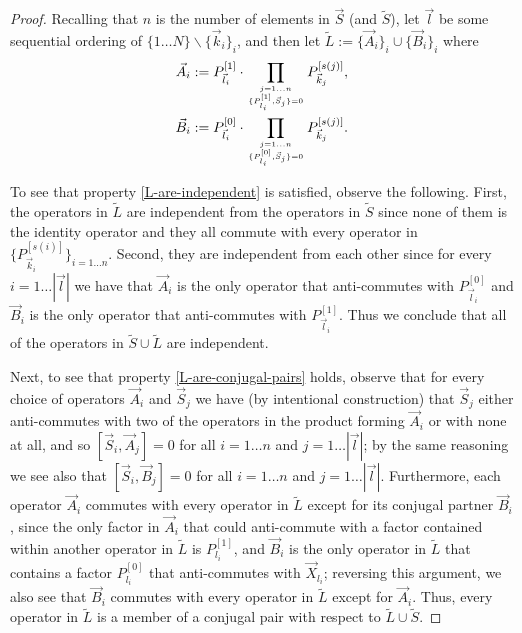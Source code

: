 \documentclass[twocolumn,showpacs,preprintnumbers,amsmath,amssymb,nofootinbib,pra,floatfix]{revtex4-1}
\newcommand{\lst}{\vec}
\newcommand{\set}{\tilde}
\begin{document}
\begin{proof}
Recalling that $n$ is the number of elements in $\lst S$ (and $\set S$), let $\lst l$ be some sequential ordering of $\{1 \dots N\}\backslash\{\vec k_i\}_i$, and then let $\set L:=\{\lst A_i\}_i\cup\{\lst B_i\}_i$ where
$$
\begin{aligned}
\lst A_i &:= P_{\lst l_i}^{[1]}\cdot \prod_{j=1\dots n\atop \{P_{l_i}^{[1]},\lst S_j\}=0} P_{\lst k_j}^{[s(j)]},\\
\lst B_i &:= P_{\lst l_i}^{[0]}\cdot \prod_{j=1\dots n\atop \{P_{l_i}^{[0]},\lst S_j\}=0} P_{\lst k_j}^{[s(j)]}.\\
\end{aligned}
$$

To see that property \ref{L-are-independent} is satisfied, observe the following.  First, the operators in $\set L$ are independent from the operators in $\set S$ since none of them is the identity operator and they all commute with every operator in $\{P_{\lst k_i}^{[s(i)]}\}_{i=1 \dots n}$.  Second, they are independent from each other since for every $i=1 \dots |\lst l|$ we have that $\vec A_i$ is the only operator that anti-commutes with $P_{\lst l_i}^{[0]}$ and $\lst B_i$ is the only operator that anti-commutes with $P_{\lst l_i}^{[1]}$.  Thus we conclude that all of the operators in $\set S\cup\set L$ are independent.

Next, to see that property \ref{L-are-conjugal-pairs} holds, observe that for every choice of operators $\lst A_i$ and $\lst S_j$ we have (by intentional construction) that $\lst S_j$ either anti-commutes with two of the operators in the product forming $\lst A_i$ or with none at all, and so $[\lst S_i,\lst A_j]=0$ for all $i=1\dots n$ and $j=1\dots |\lst l|$;  by the same reasoning we see also that $[\lst S_i,\lst B_j]=0$ for all $i=1\dots n$ and $j=1\dots |\lst l|$.  Furthermore, each operator $\lst A_i$ commutes with every operator in $\set L$ except for its conjugal partner $\lst B_i$, since the only factor in $\lst A_i$ that could anti-commute with a factor contained within another operator in $\set L$ is $P_{l_i}^{[1]}$, and $\lst B_i$ is the only operator in $\set L$ that contains a factor $P_{l_i}^{[0]}$ that anti-commutes with $\lst X_{l_i}$;  reversing this argument, we also see that $\lst B_i$ commutes with every operator in $\set L$ except for $\lst A_i$.  Thus, every operator in $\set L$ is a member of a conjugal pair with respect to $\set L\cup\set S$.


\end{proof}
\end{document}
